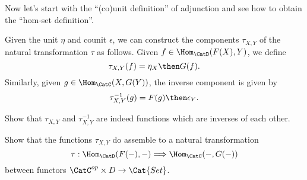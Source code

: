 Now let's start with the ``(co)unit definition'' of adjunction and see how to obtain the ``hom-set definition''. 

Given the unit $\eta$ and counit $\epsilon$, we can construct the components $\tau_{X,Y}$ of the natural transformation $\tau$ as follows. Given $f \in \Hom_{\CatD}(F(X),Y)$, we define
$$
\tau_{X,Y}(f) = \eta_X \then G(f).
$$
Similarly, given $g \in \Hom_{\CatC}(X,G(Y))$, the inverse component is given by 
$$
\tau_{X,Y}^{-1}(g) = F(g) \then \epsilon_Y. 
$$

\begin{exercise}
Show that $\tau_{X,Y}$ and $\tau_{X,Y}^{-1}$ are indeed functions which are inverses of each other. 
\end{exercise}

\begin{exercise}
Show that the functions $\tau_{X,Y}$ do assemble to a natural transformation 
$$\tau  : \Hom_{\CatD}(F(-) ,- ) \Longrightarrow \Hom_{\CatC}(-  , G(- ) )$$
between functors $\CatC^{op} \times D \rightarrow \Cat{Set}$. 
\end{exercise}



